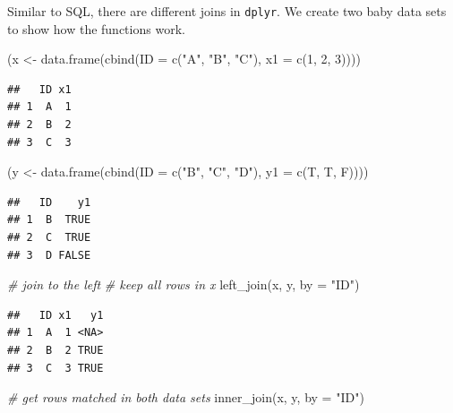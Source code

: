 \documentclass[
  12pt,
]{krantz}
\makeatletter
\newenvironment{Shaded}{\begin{snugshade}}{\end{snugshade}}
\newcommand{\AttributeTok}[1]{\textcolor[rgb]{0.61,0.61,0.61}{#1}}
\newcommand{\CommentTok}[1]{\textcolor[rgb]{0.37,0.37,0.37}{\textit{#1}}}
\newcommand{\DecValTok}[1]{\textcolor[rgb]{0.06,0.06,0.06}{#1}}
\newcommand{\FunctionTok}[1]{\textcolor[rgb]{0,0,0}{#1}}
\newcommand{\NormalTok}[1]{#1}
\newcommand{\OtherTok}[1]{\textcolor[rgb]{0.37,0.37,0.37}{#1}}
\newcommand{\StringTok}[1]{\textcolor[rgb]{0.5,0.5,0.5}{#1}}
\newenvironment{kframe}{%
\medskip{}
\setlength{\fboxsep}{.8em}
 \def\at@end@of@kframe{}%
 \ifinner\ifhmode%
  \def\at@end@of@kframe{\end{minipage}}%
  \begin{minipage}{\columnwidth}%
 \fi\fi%
 \def\FrameCommand##1{\hskip\@totalleftmargin \hskip-\fboxsep
 \colorbox{shadecolor}{##1}\hskip-\fboxsep
     \hskip-\linewidth \hskip-\@totalleftmargin \hskip\columnwidth}%
 \MakeFramed {\advance\hsize-\width
   \@totalleftmargin\z@ \linewidth\hsize
   \@setminipage}}%
 {\par\unskip\endMakeFramed%
 \at@end@of@kframe}
\renewenvironment{Shaded}{\begin{kframe}}{\end{kframe}}
\makeatother
\begin{document}
Similar to SQL, there are different joins in \texttt{dplyr}. We create two baby data sets to show how the functions work.

\begin{Shaded}
\begin{Highlighting}[]
\NormalTok{(x }\OtherTok{\textless{}{-}} \FunctionTok{data.frame}\NormalTok{(}\FunctionTok{cbind}\NormalTok{(}\AttributeTok{ID =} \FunctionTok{c}\NormalTok{(}\StringTok{"A"}\NormalTok{, }\StringTok{"B"}\NormalTok{, }\StringTok{"C"}\NormalTok{), }\AttributeTok{x1 =} \FunctionTok{c}\NormalTok{(}\DecValTok{1}\NormalTok{, }\DecValTok{2}\NormalTok{, }\DecValTok{3}\NormalTok{))))}
\end{Highlighting}
\end{Shaded}

\begin{verbatim}
##   ID x1
## 1  A  1
## 2  B  2
## 3  C  3
\end{verbatim}

\begin{Shaded}
\begin{Highlighting}[]
\NormalTok{(y }\OtherTok{\textless{}{-}} \FunctionTok{data.frame}\NormalTok{(}\FunctionTok{cbind}\NormalTok{(}\AttributeTok{ID =} \FunctionTok{c}\NormalTok{(}\StringTok{"B"}\NormalTok{, }\StringTok{"C"}\NormalTok{, }\StringTok{"D"}\NormalTok{), }\AttributeTok{y1 =} \FunctionTok{c}\NormalTok{(T, T, F))))}
\end{Highlighting}
\end{Shaded}

\begin{verbatim}
##   ID    y1
## 1  B  TRUE
## 2  C  TRUE
## 3  D FALSE
\end{verbatim}

\begin{Shaded}
\begin{Highlighting}[]
\CommentTok{\# join to the left}
\CommentTok{\# keep all rows in x}
\FunctionTok{left\_join}\NormalTok{(x, y, }\AttributeTok{by =} \StringTok{"ID"}\NormalTok{)}
\end{Highlighting}
\end{Shaded}

\begin{verbatim}
##   ID x1   y1
## 1  A  1 <NA>
## 2  B  2 TRUE
## 3  C  3 TRUE
\end{verbatim}

\begin{Shaded}
\begin{Highlighting}[]
\CommentTok{\# get rows matched in both data sets}
\FunctionTok{inner\_join}\NormalTok{(x, y, }\AttributeTok{by =} \StringTok{"ID"}\NormalTok{)}
\end{Highlighting}
\end{Shaded}
\end{document}
